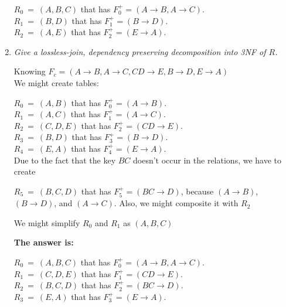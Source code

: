 \documentclass[paper=8.27in:11.69in, 14pt, DIV=calc]{scrartcl}
\begin{document}
\begin{enumerate}[label=\arabic*)]
$R_{0} \ = \ (A, B, C)$ that has $F^{+}_{0} = (A \rightarrow B , A \rightarrow C)$.\\
$R_{1} \ = \ (B, D)$ that has $F^{+}_{1} = (B \rightarrow D)$.\\
$R_{2} \ = \ (A, E)$ that has $F^{+}_{2} = (E \rightarrow A)$.\\

\newpage
\item \textit{Give a lossless-join, dependency preserving decomposition into 3NF of $R$.\\}

Knowing $F_{c} = (A \rightarrow B, A \rightarrow C, CD \rightarrow E, B \rightarrow D, E \rightarrow A)$\\
\hfill
We might create tables:

$R_{0} \ = \ (A, B)$ that has $F^{+}_{0} = (A \rightarrow B)$.\\
$R_{1} \ = \ (A, C)$ that has $F^{+}_{1} = (A \rightarrow C)$.\\
$R_{2} \ = \ (C, D, E)$ that has $F^{+}_{2} = (CD \rightarrow E)$.\\
$R_{3} \ = \ (B, D)$ that has $F^{+}_{3} = (B \rightarrow D)$.\\
$R_{4} \ = \ (E, A)$ that has $F^{+}_{4} = (E \rightarrow A)$.\\

Due to the fact that the key $BC$ doesn't occur in the relations, we have to create 

$R_{5} \ = \ (B, C, D)$ that has $F^{+}_{5} = (BC \rightarrow D)$, because $(A \rightarrow B)$, $(B \rightarrow D)$, and $(A \rightarrow C)$. Also, we might composite it with $R_{2}$

We might simplify $R_{0}$ and $R_{1}$ as $(A, B, C)$

\textbf{The answer is:}

$R_{0} \ = \ (A, B, C)$ that has $F^{+}_{0} = (A \rightarrow B, A \rightarrow C)$.\\
$R_{1} \ = \ (C, D, E)$ that has $F^{+}_{1} = (CD \rightarrow E)$.\\
$R_{2} \ = \ (B, C, D)$ that has $F^{+}_{2} = (BC \rightarrow D)$.\\
$R_{3} \ = \ (E, A)$ that has $F^{+}_{3} = (E \rightarrow A)$.\\

\end{enumerate}
\end{document}
